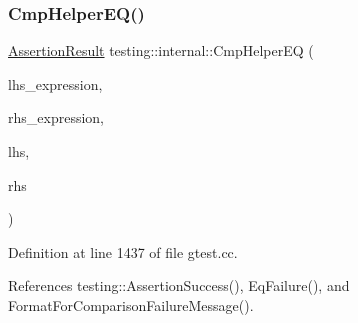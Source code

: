 \mbox{\label{namespacetesting_1_1internal_a46582d95cbfe3d3d8f6945c9e9cd779c}} 
\subsubsection{\texorpdfstring{Cmp\+Helper\+E\+Q()}{CmpHelperEQ()}\hspace{0.1cm}{\footnotesize\ttfamily [2/2]}}
{\footnotesize\ttfamily \hyperlink{classtesting_1_1AssertionResult}{Assertion\+Result} testing\+::internal\+::\+Cmp\+Helper\+EQ (\begin{DoxyParamCaption}\item[{const char $\ast$}]{lhs\+\_\+expression,  }\item[{const char $\ast$}]{rhs\+\_\+expression,  }\item[{\hyperlink{namespacetesting_1_1internal_a05c6bd9ede5ccdf25191a590d610dcc6}{Biggest\+Int}}]{lhs,  }\item[{\hyperlink{namespacetesting_1_1internal_a05c6bd9ede5ccdf25191a590d610dcc6}{Biggest\+Int}}]{rhs }\end{DoxyParamCaption})}



Definition at line 1437 of file gtest.\+cc.



References testing\+::\+Assertion\+Success(), Eq\+Failure(), and Format\+For\+Comparison\+Failure\+Message().


